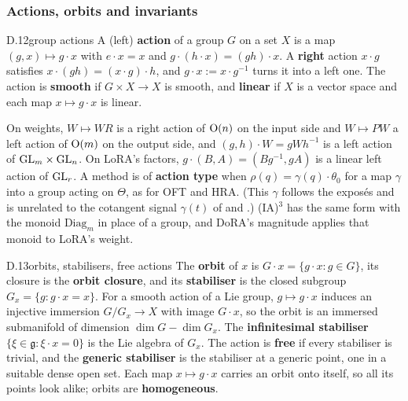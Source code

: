 \subsubsection*{Actions, orbits and invariants}

\begin{bgentry}{D.12}{group actions}
A (left) \textbf{action} of a group $G$ on a set $X$ is a map $(g,x)\mapsto g\cdot x$ with $e\cdot x=x$ and
$g\cdot(h\cdot x)=(gh)\cdot x$. A \textbf{right} action $x\cdot g$ satisfies $x\cdot(gh)=(x\cdot g)\cdot h$, and $g\cdot
x:=x\cdot g^{-1}$ turns it into a left one. The action is \textbf{smooth} if $G\times X\to X$ is smooth, and
\textbf{linear} if $X$ is a vector space and each map $x\mapsto g\cdot x$ is linear.
\end{bgentry}

On weights, $W\mapsto WR$ is a right action of $\mathrm{O}(n)$ on the input side and $W\mapsto PW$ a left action of $\mathrm{O}(m)$
on the output side, and $(g,h)\cdot W=gWh^{-1}$ is a left action of $\mathrm{GL}_m\times\mathrm{GL}_n$. On LoRA's factors,
$g\cdot(B,A)=(Bg^{-1},gA)$ is a linear left action of $\mathrm{GL}_r$. A method is of \textbf{action type} when
$\rho(q)=\gamma(q)\cdot\theta_0$ for a map $\gamma$ into a group acting on $\Theta$, as for OFT and HRA. (This $\gamma$
follows the exposés and is unrelated to the cotangent signal $\gamma(t)$ of  and .) (IA)$^3$ has
the same form with the monoid $\mathrm{Diag}_m$ in place of a group, and DoRA's magnitude applies that monoid to LoRA's
weight.


\begin{bgentry}{D.13}{orbits, stabilisers, free actions}
The \textbf{orbit} of $x$ is $G\cdot x=\{g\cdot x:g\in G\}$, its closure is the \textbf{orbit closure}, and its
\textbf{stabiliser} is the closed subgroup $G_x=\{g:g\cdot x=x\}$. For a smooth action of a Lie group, $g\mapsto g\cdot
x$ induces an injective immersion $G/G_x\to X$ with image $G\cdot x$, so the orbit is an immersed submanifold of
dimension $\dim G-\dim G_x$. The \textbf{infinitesimal stabiliser} $\{\xi\in\mathfrak g:\xi\cdot x=0\}$ is the Lie
algebra of $G_x$. The action is \textbf{free} if every stabiliser is trivial, and the \textbf{generic stabiliser} is the
stabiliser at a generic point, one in a suitable dense open set. Each map $x\mapsto g\cdot x$ carries an orbit onto
itself, so all its points look alike; orbits are \textbf{homogeneous}.
\end{bgentry}

